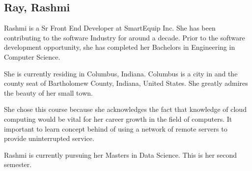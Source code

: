 \subsection{Ray, Rashmi}

Rashmi is a Sr Front End Developer at SmartEquip Inc. She has been contributing to the software Industry for around a decade.  Prior to the software development opportunity, she has completed her Bachelors in Engineering in Computer Science. 

She is currently residing in Columbus, Indiana. Columbus is a city in and the county seat of Bartholomew County, Indiana, United States. She greatly admires the beauty of her small town.

She chose this course because she acknowledges the fact that knowledge of cloud computing would be vital for her career growth in the field of computers. It important to learn concept behind of using a network of remote servers to provide uninterrupted service.

Rashmi is currently pursuing her Masters in Data Science. This is her second semester.

